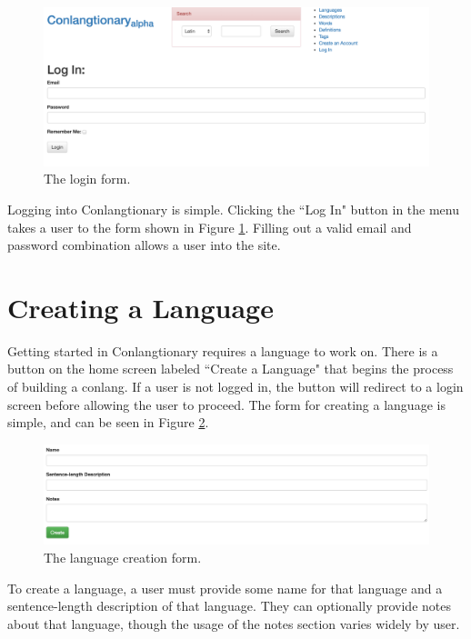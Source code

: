 \begin{figure}[h]
\includegraphics[width=\textwidth]{figures/log-in}
\caption{The login form.}
\centering
\label{fig:log-in}
\end{figure}

Logging into Conlangtionary is simple. Clicking the ``Log In" button in the menu takes a user to the form shown in Figure \ref{fig:log-in}. Filling out a valid email and password combination allows a user into the site.

\section{Creating a Language}
\label{sec:creating-language}

Getting started in Conlangtionary requires a language to work on. There is a button on the home screen labeled ``Create a Language" that begins the process of building a conlang. If a user is not logged in, the button will redirect to a login screen before allowing the user to proceed. The form for creating a language is simple, and can be seen in Figure \ref{fig:create-language}.

\begin{figure}[h]
\includegraphics[width=\textwidth]{figures/create-language}
\caption{The language creation form.}
\centering
\label{fig:create-language}
\end{figure}

To create a language, a user must provide some name for that language and a sentence-length description of that language. They can optionally provide notes about that language, though the usage of the notes section varies widely by user.

